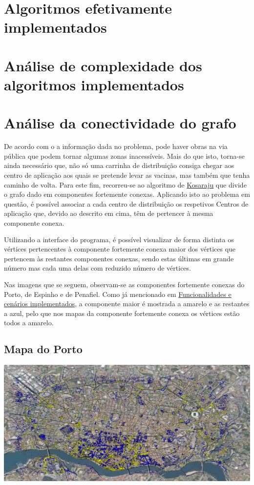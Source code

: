 \documentclass[12pt,a4paper]{report}
\begin{document}
\chapter{Algoritmos efetivamente implementados}



\chapter{Análise de complexidade dos algoritmos implementados}



\chapter{Análise da conectividade do grafo}
De acordo com o a informação dada no problema, pode haver obras na via pública que podem tornar algumas zonas inacessíveis.
Mais do que isto, torna-se ainda necessário que, não só uma carrinha de distribuição consiga chegar aos centro de
aplicação aos quais se pretende levar as vacinas, mas também que tenha caminho de volta. Para este fim, recorreu-se
ao algoritmo de \hyperref[algo:kosaraju]{Kosaraju} que divide o grafo dado em componentes fortemente conexas.
Aplicando isto ao problema em questão, é possível associar a cada centro de distribuição os respetivos Centros 
de aplicação que, devido ao descrito em cima, têm de pertencer à mesma componente conexa. \par

Utilizando a interface do programa, é possível visualizar de forma distinta os vértices pertencentes à
componente fortemente conexa maior dos vértices que pertencem às restantes componentes conexas, sendo estas últimas em grande número
mas cada uma delas com reduzido número de vértices. \par
Nas imagens que se seguem, observam-se as componentes fortemente conexas do Porto, de Espinho e de Penafiel. Como já mencionado 
em \hyperref[func]{Funcionalidades e cenários implementados}, a componente maior é mostrada a amarelo e as restantes a azul, pelo que
nos mapas da componente fortemente conexa os vértices estão todos a amarelo.


\section{Mapa do Porto}
\includegraphics[width=1.0\textwidth]{./imgs/scc/portoSCC.png}
\end{document}
